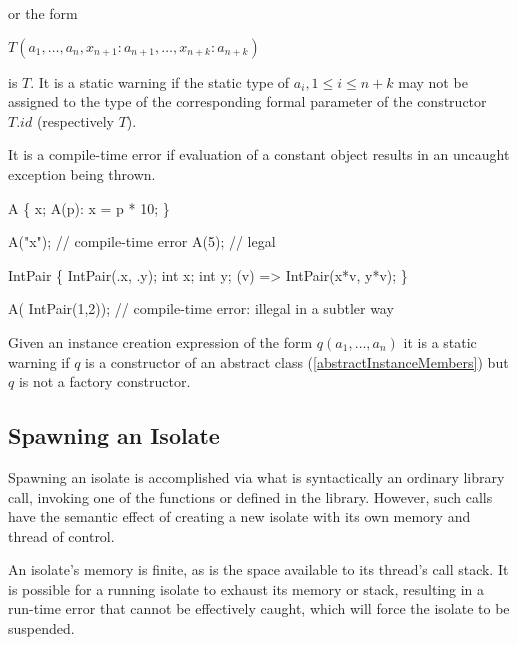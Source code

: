 \documentclass{article}
\begin{document}
or the form

\CONST{} $T(a_1, \ldots , a_n, x_{n+1}: a_{n+1}, \ldots , x_{n+k}: a_{n+k})$

is $T$.
It is a static warning if the static type of $a_i, 1 \le i \le n+ k$ may not be assigned to the type of the corresponding formal parameter of the constructor $T.id$ (respectively $T$).

\LMHash{}
It is a compile-time error if evaluation of a constant object results in an uncaught exception being thrown.


\begin{dartCode}
\CLASS{} A \{
   \FINAL{} x;
   \CONST{} A(p): x = p * 10;
\}

\CONST{} A("x"); // compile-time error
\CONST{} A(5); // legal

\CLASS{} IntPair \{
  \CONST{} IntPair(\THIS{}.x, \THIS{}.y);
  \FINAL{} int x;
  \FINAL{} int y;
  \OPERATOR *(v) => \NEW{} IntPair(x*v, y*v);
\}

\CONST{} A(\CONST{} IntPair(1,2)); // compile-time error: illegal in a subtler way
\end{dartCode}


\LMHash{}
Given an instance creation expression of the form \CONST{} $q(a_1, \ldots , a_n)$ it is a static warning if $q$ is a constructor of an abstract class (\ref{abstractInstanceMembers}) but $q$ is not a factory constructor.


\subsection{Spawning an Isolate}

\LMHash{}
Spawning an isolate is accomplished via what is syntactically an ordinary library call, invoking one of the functions  or  defined in the  library.
However, such calls have the semantic effect of creating a new isolate with its own memory and thread of control.

\LMHash{}
An isolate's memory is finite, as is the space available to its thread's call stack.
It is possible for a running isolate to exhaust its memory or stack, resulting in a run-time error that cannot be effectively caught, which will force the isolate to be suspended.
\end{document}
